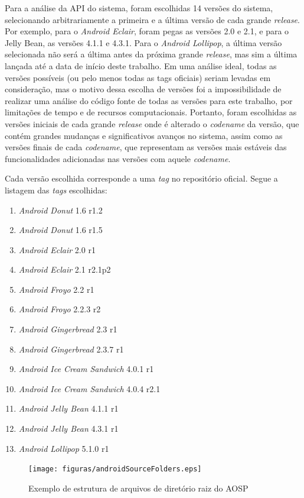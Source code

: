 Para a análise da API do sistema, foram escolhidas 14 versões do sistema, selecionando arbitrariamente a primeira e a última versão de cada grande \textit{release}. Por exemplo, para o \textit{Android Eclair}, foram pegas as versões 2.0 e 2.1, e para o Jelly Bean, as versões 4.1.1 e 4.3.1. Para o \textit{Android Lollipop}, a última versão selecionada não será a última antes da próxima grande \textit{release}, mas sim a última lançada até a data de início deste trabalho. Em uma análise ideal, todas as versões possíveis (ou pelo menos todas as tags oficiais) seriam levadas em consideração, mas o motivo dessa escolha de versões foi a impossibilidade de realizar uma análise do código fonte de todas as versões para este trabalho, por limitações de tempo e de recursos computacionais. Portanto, foram escolhidas as versões iniciais de cada grande \textit{release} onde é alterado o \textit{codename} da versão, que contém grandes mudanças e significativos avanços no sistema, assim como as versões finais de cada \textit{codename}, que representam as versões mais estáveis das funcionalidades adicionadas nas versões com aquele \textit{codename}.
 
Cada versão escolhida corresponde a uma \textit{tag} no repositório oficial. Segue a listagem das \textit{tags} escolhidas:
\begin{enumerate}
\item \textit{Android Donut} 1.6 r1.2
\item \textit{Android Donut} 1.6 r1.5
\item \textit{Android Eclair} 2.0 r1
\item \textit{Android Eclair} 2.1 r2.1p2
\item \textit{Android Froyo} 2.2 r1
\item \textit{Android Froyo} 2.2.3 r2
\item \textit{Android Gingerbread} 2.3 r1
\item \textit{Android Gingerbread} 2.3.7 r1
\item \textit{Android Ice Cream Sandwich} 4.0.1 r1
\item \textit{Android Ice Cream Sandwich} 4.0.4 r2.1
\item \textit{Android Jelly Bean} 4.1.1 r1
\item \textit{Android Jelly Bean} 4.3.1 r1
\item \textit{Android Lollipop} 5.1.0 r1
\end{enumerate}

\begin{figure}[!htb]
\centering
\texttt{[image: figuras/androidSourceFolders.eps]}
\caption{Exemplo de estrutura de arquivos de diretório raiz do AOSP}
\label{androidSourceFolders}
\end{figure}

